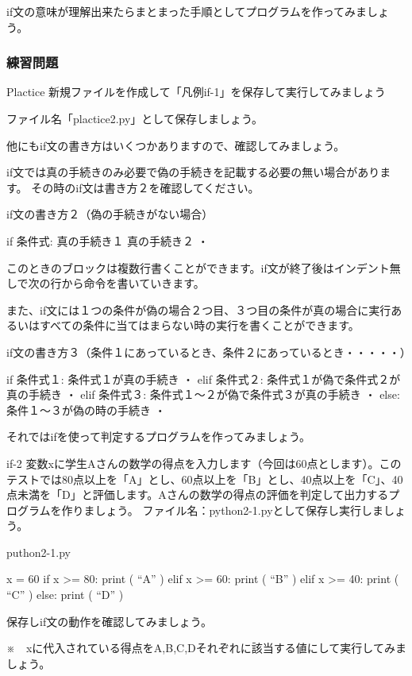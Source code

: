\documentclass[11pt,a4paper,dvipdfmx,titlepage]{jsreport}
\begin{document}
if文の意味が理解出来たらまとまった手順としてプログラムを作ってみましょう。

\subsubsection{練習問題}
\begin{plabox}{Plactice}
新規ファイルを作成して「凡例if-1」を保存して実行してみましょう

ファイル名「plactice2.py」として保存しましょう。
\end{plabox}

他にもif文の書き方はいくつかありますので、確認してみましょう。

if文では真の手続きのみ必要で偽の手続きを記載する必要の無い場合があります。
その時のif文は書き方２を確認してください。
\begin{grabox}{if文の書き方２（偽の手続きがない場合）}
\begin{listing}{1}
if 条件式:
    真の手続き１
    真の手続き２
    ・
\end{listing}
\end{grabox}
このときのブロックは複数行書くことができます。if文が終了後はインデント無しで次の行から命令を書いていきます。

また、if文には１つの条件が偽の場合２つ目、３つ目の条件が真の場合に実行あるいはすべての条件に当てはまらない時の実行を書くことができます。

\begin{grabox}{if文の書き方３（条件１にあっているとき、条件２にあっているとき・・・・・）}
\begin{listing}{1}
if 条件式１:
    条件式１が真の手続き
    ・
elif 条件式２:
    条件式１が偽で条件式２が真の手続き
    ・
elif 条件式３:
    条件式１～２が偽で条件式３が真の手続き
    ・
else:
    条件１～３が偽の時の手続き
    ・
\end{listing}
\end{grabox}
\newpage
それではifを使って判定するプログラムを作ってみましょう。
\begin{pabox}{if-2}
変数xに学生Aさんの数学の得点を入力します（今回は60点とします）。このテストでは80点以上を「A」とし、60点以上を「B」とし、40点以上を「C」、40点未満を「D」と評価します。Aさんの数学の得点の評価を判定して出力するプログラムを作りましょう。
ファイル名：python2-1.pyとして保存し実行しましょう。
\begin{legbox}{puthon2-1.py}
\begin{listing}{1}
x = 60
if x >= 80:
    print ( “A” )
elif x >= 60:
    print ( “B” )
elif x >= 40:
    print ( “C” )
else:
    print ( “D” )
\end{listing}
\end{legbox}
保存しif文の動作を確認してみましょう。

※　xに代入されている得点をA,B,C,Dそれぞれに該当する値にして実行してみましょう。
\end{pabox}
\end{document}
